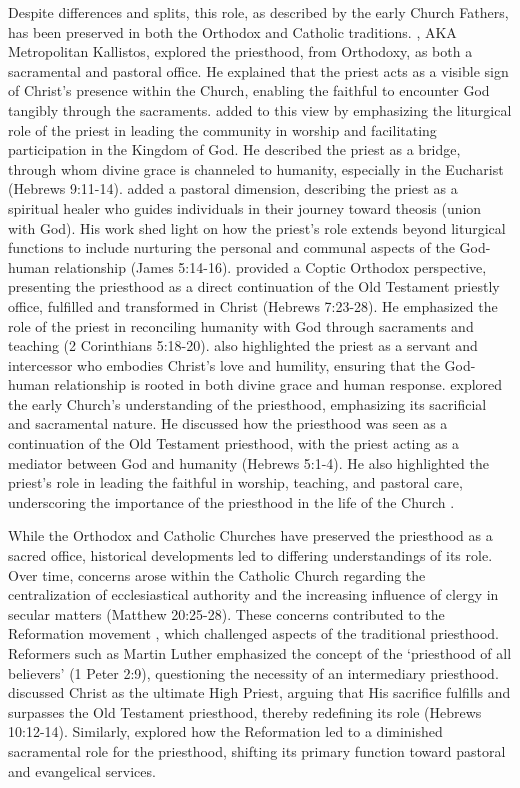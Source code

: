 \documentclass[12pt, doc]{apa7}   	%
\begin{document}
Despite differences and splits, this role, as described by the early Church Fathers, has been preserved in both the Orthodox and Catholic traditions.  \citet{orthodox_church_ware}, AKA Metropolitan Kallistos, explored the priesthood, from Orthodoxy, as both a sacramental and pastoral office. He explained that the priest acts as a visible sign of Christ’s presence within the Church, enabling the faithful to encounter God tangibly through the sacraments. \citet{eucharist_schmemann} added to this view by emphasizing the liturgical role of the priest in leading the community in worship and facilitating participation in the Kingdom of God. He described the priest as a bridge, through whom divine grace is channeled to humanity, especially in the Eucharist (Hebrews 9:11-14). \citet{priests_zacharias} added a pastoral dimension, describing the priest as a spiritual healer who guides individuals in their journey toward theosis (union with God). His work shed light on how the priest’s role extends beyond liturgical functions to include nurturing the personal and communal aspects of the God-human relationship (James 5:14-16).  \cite{priesthood_shenouda} provided a Coptic Orthodox perspective, presenting the priesthood as a direct continuation of the Old Testament priestly office, fulfilled and transformed in Christ (Hebrews 7:23-28). He emphasized the role of the priest in reconciling humanity with God through sacraments and teaching (2 Corinthians 5:18-20). \citeauthor{priesthood_shenouda} also highlighted the priest as a servant and intercessor who embodies Christ’s love and humility, ensuring that the God-human relationship is rooted in both divine grace and human response.  \citet{early_church_akin} explored the early Church’s understanding of the priesthood, emphasizing its sacrificial and sacramental nature. He discussed how the priesthood was seen as a continuation of the Old Testament priesthood, with the priest acting as a mediator between God and humanity (Hebrews 5:1-4). He also highlighted the priest’s role in leading the faithful in worship, teaching, and pastoral care, underscoring the importance of the priesthood in the life of the Church \citep{early_church_akin}.

While the Orthodox and Catholic Churches have preserved the priesthood as a sacred office, historical developments led to differing understandings of its role. Over time, concerns arose within the Catholic Church regarding the centralization of ecclesiastical authority and the increasing influence of clergy in secular matters (Matthew 20:25-28). These concerns contributed to the Reformation movement \citep{reformation_lutzer}, which challenged aspects of the traditional priesthood.  Reformers such as Martin Luther \citep{reformation_lull_nelson} emphasized the concept of the ‘priesthood of all believers’ (1 Peter 2:9), questioning the necessity of an intermediary priesthood. \citet{hebrews_wright} discussed Christ as the ultimate High Priest, arguing that His sacrifice fulfills and surpasses the Old Testament priesthood, thereby redefining its role (Hebrews 10:12-14). Similarly, \citet{reformation_macCulloch} explored how the Reformation led to a diminished sacramental role for the priesthood, shifting its primary function toward pastoral and evangelical services.
\end{document}
